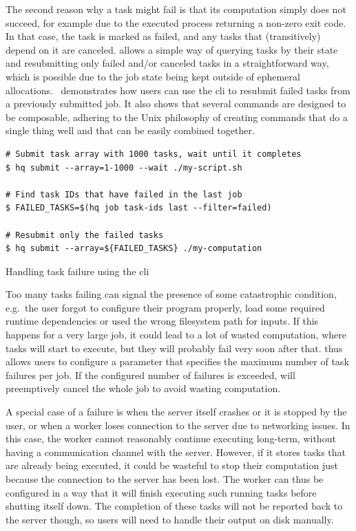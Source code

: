 The second reason why a task might fail is that its computation simply does not succeed, for
example due to the executed process returning a non-zero exit code. In that case, the task is
marked as failed, and any tasks that (transitively) depend on it are canceled.
\hyperqueue{} allows a simple way of querying tasks by their state and resubmitting only
failed and/or canceled tasks in a straightforward way, which is possible due to the job state being
kept outside of ephemeral allocations.~ demonstrates how users can use the
\hq{} \gls{cli} to resubmit failed tasks from a previously
submitted job. It also shows that several \hq{} commands are designed to be
composable, adhering to the Unix philosophy of creating commands that do a single thing well and
that can be easily combined together.

\begin{listing}[h]
	\begin{verbatim}
# Submit task array with 1000 tasks, wait until it completes
$ hq submit --array=1-1000 --wait ./my-script.sh

# Find task IDs that have failed in the last job
$ FAILED_TASKS=$(hq job task-ids last --filter=failed)

# Resubmit only the failed tasks
$ hq submit --array=${FAILED_TASKS} ./my-computation
	\end{verbatim}
	\caption{Handling task failure using the \hyperqueue{} \gls{cli}}
	\label{lst:hq-cli-fault-tolerance}
\end{listing}

Too many tasks failing can signal the presence of some catastrophic condition, e.g.\ the user
forgot to configure their program properly, load some required runtime dependencies or used the
wrong filesystem path for inputs. If this happens for a very large job, it could lead to a lot of
wasted computation, where tasks will start to execute, but they will probably fail very soon after
that. \hyperqueue{} thus allows users to configure a parameter that specifies the maximum
number of task failures per job. If the configured number of failures is exceeded,
\hq{} will preemptively cancel the whole job to avoid wasting computation.

A special case of a failure is when the server itself crashes or it is stopped by the user, or when
a worker loses connection to the server due to networking issues. In this case, the worker cannot
reasonably continue executing long-term, without having a communication channel with the server.
However, if it stores tasks that are already being executed, it could be wasteful to stop their
computation just because the connection to the server has been lost. The worker can thus be
configured in a way that it will finish executing such running tasks before shutting itself down.
The completion of these tasks will not be reported back to the server though, so users will need to
handle their output on disk manually.

